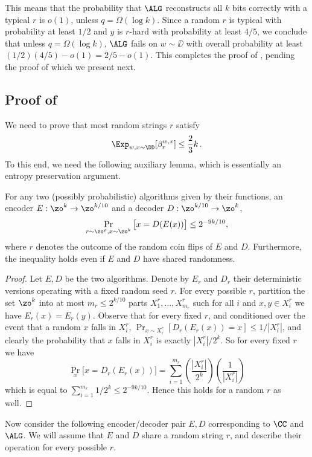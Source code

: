 This means that the probability that $\ALG$ reconstructs all $k$ bits correctly with a typical $r$ is $o(1)$, unless $q = \Omega(\log k)$. Since a random $r$ is typical with probability at least $1/2$ and $y$ is $r$-hard with probability at least $4/5$, we conclude that unless $q = \Omega(\log k)$, $\ALG$ fails on $w \sim \DD$ with overall probability at least $(1/2)(4/5) - o(1) = 2/5 -o(1)$. This completes the proof of , pending the proof of  which we present next.


\subsection{Proof of } \label{sec:proof_ent}
%
We need to prove that most random strings $r$ satisfy
\[
\Exp_{w,x \sim \DD} [ \beta_r^{w,x}] \leq \frac{2}{3}k\,.
\]
To this end, we need the following auxiliary lemma, which is essentially an entropy preservation argument.
\begin{lemma}\label{lem:en_dec}
For any two (possibly probabilistic) algorithms given by their functions, an encoder $E:\zo^k \to \zo^{k/10}$ and a decoder $D:\zo^{k/10} \to \zo^k$, $$\Pr_{r \sim \zo^\rho,x \sim \zo^k}\big[x = D(E(x))\big] \leq 2^{-9k/10},$$ where $r$ denotes the outcome of the random coin flips of $E$ and $D$. Furthermore, the inequality holds even if $E$ and $D$ have shared randomness.
\end{lemma}
\begin{proof}
Let $E,D$ be the two algorithms. Denote by $E_r$ and $D_r$ their deterministic versions operating with a fixed random seed $r$.
For every possible $r$, partition the set $\zo^k$ into at most ${m_r}
\leq 2^{k/10}$ parts $X^r_1,\ldots,X^r_{m_r}$ such for all $i$ and
$x,y \in X^r_i$ we have $E_r(x) = E_r(y)$. Observe that for every
fixed $r$, and conditioned over the event that a random $x$ falls in
$X^r_i$, $\Pr_{x \sim X_i^r}[D_r(E_r(x)) = x] \leq 1/|X^r_i|$, and
clearly the probability that $x$ falls in $X^r_i$ is exactly
$|X^r_i|/2^k$. So for every fixed $r$ we have 
\[
\Pr_{x}\bigl[x = D_r(E_r(x))\bigr] = \sum_{i=1}^{m_r}
\left(\frac{|X^r_i|}{2^k}\right)\left(\frac{1}{|X^r_i|}\right)
\]
which is equal to $\sum_{i=1}^{m_r} 1/2^k \leq 2^{-9k/10}$. Hence this holds for a random $r$ as well.
\end{proof}

Now consider the following encoder/decoder pair $E,D$ corresponding to $\CC$ and $\ALG$. We will assume that $E$ and $D$ share a random string $r$, and describe their operation for every possible $r$.

